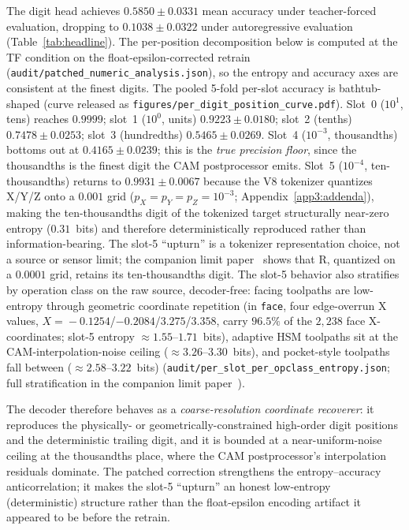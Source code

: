 \documentclass[sensors,article,submit,moreauthors,pdftex]{Definitions/mdpi}
\begin{document}
The digit head achieves $0.5850 \pm 0.0331$ mean accuracy under teacher-forced evaluation, dropping to $0.1038 \pm 0.0322$ under autoregressive evaluation (Table~\ref{tab:headline}). The per-position decomposition below is computed at the TF condition on the float-epsilon-corrected retrain (\texttt{audit/patched\_numeric\_analysis.json}), so the entropy and accuracy axes are consistent at the finest digits. The pooled 5-fold per-slot accuracy is bathtub-shaped (curve released as \texttt{figures/per\_digit\_position\_curve.pdf}). Slot~0 ($10^{1}$, tens) reaches $0.9999$; slot~1 ($10^{0}$, units) $0.9223 \pm 0.0180$; slot~2 (tenths) $0.7478 \pm 0.0253$; slot~3 (hundredths) $0.5465 \pm 0.0269$. Slot~4 ($10^{-3}$, thousandths) bottoms out at $0.4165 \pm 0.0239$; this is the \emph{true precision floor}, since the thousandths is the finest digit the CAM postprocessor emits. Slot~5 ($10^{-4}$, ten-thousandths) returns to $0.9931 \pm 0.0067$ because the V8 tokenizer quantizes X/Y/Z onto a $0.001$ grid ($p_X\!=\!p_Y\!=\!p_Z\!=\!10^{-3}$; Appendix~\ref{app3:addenda}), making the ten-thousandths digit of the tokenized target structurally near-zero entropy ($0.31$~bits) and therefore deterministically reproduced rather than information-bearing. The slot-5 ``upturn'' is a tokenizer representation choice, not a source or sensor limit; the companion limit paper~\cite{paperB_entropy} shows that R, quantized on a $0.0001$ grid, retains its ten-thousandths digit. The slot-5 behavior also stratifies by operation class on the raw source, decoder-free: facing toolpaths are low-entropy through geometric coordinate repetition (in \texttt{face}, four edge-overrun X values, $X\!=\!-0.1254$/$-0.2084$/$3.275$/$3.358$, carry $96.5\%$ of the $2{,}238$ face X-coordinates; slot-5 entropy $\approx\!1.55$--$1.71$~bits), adaptive HSM toolpaths sit at the CAM-interpolation-noise ceiling ($\approx\!3.26$--$3.30$~bits), and pocket-style toolpaths fall between ($\approx\!2.58$--$3.22$~bits) (\texttt{audit/per\_slot\_per\_opclass\_entropy.json}; full stratification in the companion limit paper~\cite{paperB_entropy}).

The decoder therefore behaves as a \emph{coarse-resolution coordinate recoverer}: it reproduces the physically- or geometrically-constrained high-order digit positions and the deterministic trailing digit, and it is bounded at a near-uniform-noise ceiling at the thousandths place, where the CAM postprocessor's interpolation residuals dominate. The patched correction strengthens the entropy--accuracy anticorrelation; it makes the slot-5 ``upturn'' an honest low-entropy (deterministic) structure rather than the float-epsilon encoding artifact it appeared to be before the retrain.
\end{document}
